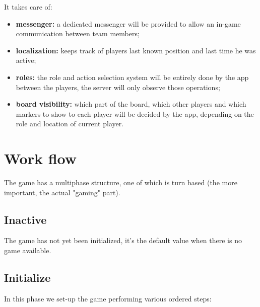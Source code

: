 				It takes care of:
				\begin{itemize}
					\item \textbf{messenger:} a dedicated messenger will be provided to allow an in-game communication between team members;
					\item \textbf{localization:} keeps track of players last known position and last time he was active;
					\item \textbf{roles:} the role and action selection system will be entirely done by the app between the players, the server will only observe those operations;
					\item \textbf{board visibility:} which part of the board, which other players and which markers to show to each player will be decided by the app, depending on the role and location of current player.
				\end{itemize}
			
	\section{Work flow}
	\label{workflow:general}
		
		The game has a multiphase structure, one of which is turn based (the more important, the actual "gaming" part).
	
		\subsection{Inactive}
		
			The game has not yet been initialized, it's the default value when there is no game available.
	
		\subsection{Initialize}
		
			In this phase we set-up the game performing various ordered steps:
			
